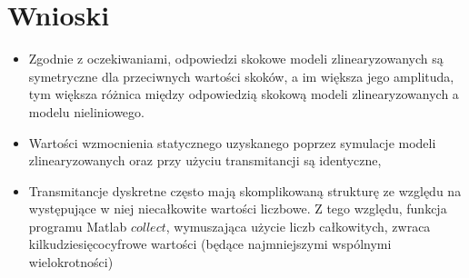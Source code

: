 \section{Wnioski}
\begin{itemize}
\item Zgodnie z oczekiwaniami, odpowiedzi skokowe modeli zlinearyzowanych są symetryczne dla przeciwnych wartości skoków, a im większa jego amplituda,  tym większa różnica między odpowiedzią skokową modeli zlinearyzowanych a modelu nieliniowego.
\item Wartości wzmocnienia statycznego uzyskanego poprzez symulacje modeli zlinearyzowanych oraz przy użyciu transmitancji są identyczne,
\item Transmitancje dyskretne często mają skomplikowaną strukturę ze względu na występujące w niej niecałkowite wartości liczbowe. Z tego względu, funkcja programu Matlab $\textit{collect}$, wymuszająca użycie liczb całkowitych, zwraca kilkudziesięcocyfrowe wartości (będące najmniejszymi wspólnymi wielokrotności)
\end{itemize}